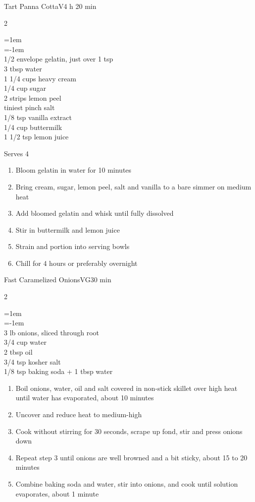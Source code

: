 \documentclass{article}
\newenvironment{recipe}[3][]
    {\begin{cardbase}[#1]{#2}{#3}
    \columnratio{0.333}
    \begin{paracol}{2}}
    {\end{paracol}\end{cardbase}}
\newcommand{\nextcolumn}{\switchcolumn}
\newenvironment{ingredients}
    {
    \begin{obeylines}
    \vspace{\parskip}
    \setlength{\parskip}{0.25em}
    \vspace{-0.25em}
    \leftskip=1em
    \parindent=-1em}
    {\end{obeylines}}
\newenvironment{steps}
    {\begin{enumerate}[leftmargin=*,topsep=0pt]}
    {\end{enumerate}}
\newcommand{\tag}[1]{\hspace{1em}#1}
\newcommand{\symboltag}[2]{\tag{#1\hspace{0.4em}#2}}
\newcommand{\totaltime}[1]{\symboltag{\raisebox{-0.1em}{\small\StopWatchEnd}}{#1}}
\begin{document}
\begin{recipe}{Tart Panna Cotta}{\tag{V}\totaltime{4 h 20 min}}
\begin{ingredients}
1/2 envelope gelatin, just over 1 tsp
3 tbsp water
1 1/4 cups heavy cream
1/4 cup sugar
2 strips lemon peel
tiniest pinch salt
1/8 tsp vanilla extract
1/4 cup buttermilk
1 1/2 tsp lemon juice
\end{ingredients}
\nextcolumn
Serves 4
\begin{steps}
    \item Bloom gelatin in water for 10 minutes
    \item Bring cream, sugar, lemon peel, salt and vanilla to a bare simmer on medium heat
    \item Add bloomed gelatin and whisk until fully dissolved
    \item Stir in buttermilk and lemon juice
    \item Strain and portion into serving bowls
    \item Chill for 4 hours or preferably overnight
\end{steps}
\end{recipe}

\begin{recipe}{Fast Caramelized Onions}{\tag{VG}\totaltime{30 min}}
\begin{ingredients}
3 lb onions, sliced through root
3/4 cup water
2 tbsp oil
3/4 tsp kosher salt
1/8 tsp baking soda + 1 tbsp water
\end{ingredients}
\nextcolumn
\begin{steps}
    \item Boil onions, water, oil and salt covered in non-stick skillet over high heat until water has evaporated, about 10 minutes
    \item Uncover and reduce heat to medium-high
    \item Cook without stirring for 30 seconds, scrape up fond, stir and press onions down
    \item Repeat step 3 until onions are well browned and a bit sticky, about 15 to 20 minutes
    \item Combine baking soda and water, stir into onions, and cook until solution evaporates, about 1 minute
\end{steps}
\end{recipe}
\end{document}
